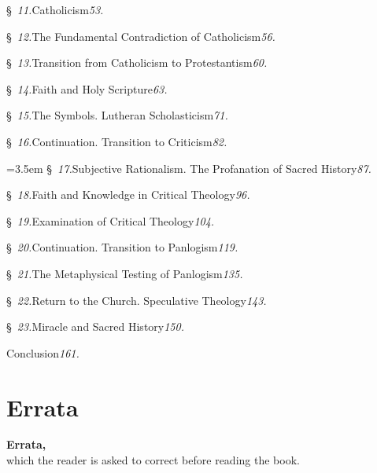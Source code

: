 \documentclass[12pt]{book}
\begin{document}
§~\textit{11.}\quad Catholicism\dotfill\textit{53.}\par
§~\textit{12.}\quad The Fundamental Contradiction of Catholicism\dotfill\textit{56.}\par
§~\textit{13.}\quad Transition from Catholicism to Protestantism\dotfill\textit{60.}\par
§~\textit{14.}\quad Faith and Holy Scripture\dotfill\textit{63.}\par
§~\textit{15.}\quad The Symbols. Lutheran Scholasticism\dotfill\textit{71.}\par
§~\textit{16.}\quad Continuation. Transition to Criticism\dotfill\textit{82.}\par
\hangindent=3.5em
§~\textit{17.}\quad Subjective Rationalism. The Profanation of Sacred
  History\dotfill\textit{87.}\par
§~\textit{18.}\quad Faith and Knowledge in Critical Theology\dotfill\textit{96.}\par
§~\textit{19.}\quad Examination of Critical Theology\dotfill\textit{104.}\par
§~\textit{20.}\quad Continuation. Transition to Panlogism\dotfill\textit{119.}\par
§~\textit{21.}\quad The Metaphysical Testing of Panlogism\dotfill\textit{135.}\par
§~\textit{22.}\quad Return to the Church. Speculative Theology\dotfill\textit{143.}\par
§~\textit{23.}\quad Miracle and Sacred History\dotfill\textit{150.}\par
\hspace*{3.2em}Conclusion\dotfill\textit{161.}\par

\endgroup

\chapter*{Errata}
{}

\begin{center}
{\large\bfseries Errata,}\\[0.4\baselineskip]
which the reader is asked to correct before reading the book.
\end{center}
\medskip
\end{document}
